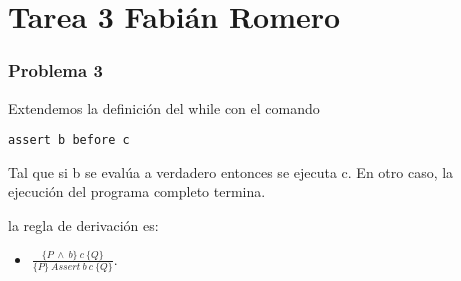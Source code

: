 \documentclass[12pt]{report}
\begin{document}

\begin{coqdoccode}
\end{coqdoccode}
\section{Tarea 3 Fabián Romero}

\begin{coqdoccode}
\coqdocemptyline
\coqdocemptyline
\end{coqdoccode}
\subsubsection{Problema 3}



Extendemos la definición del while con el comando
\begin{verbatim}
assert b before c
\end{verbatim}
Tal que si b se evalúa a verdadero entonces se ejecuta c. En otro caso, la ejecución del programa completo termina.


la regla de derivación es:



\begin{itemize}
\item  $ \frac{\{P\>\wedge\> b\}\>c\>\{Q\}}{\{P\}\>Assert\>b\>c\>\{Q\}} $.

\end{itemize}
\end{document}
